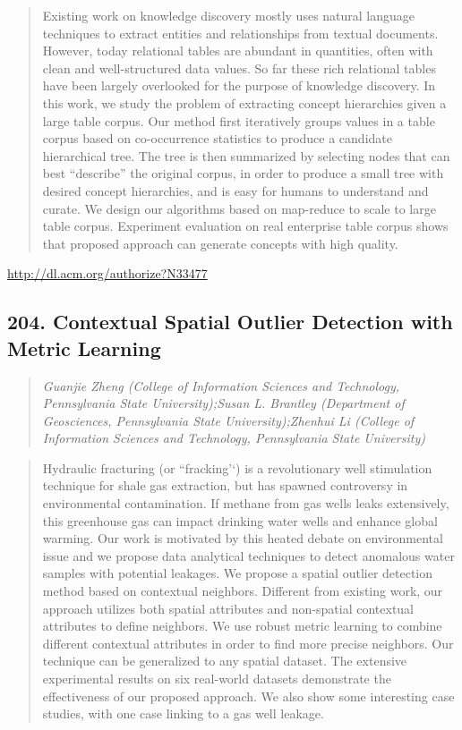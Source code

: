 \documentclass{article}
\begin{document}
\begin{quote}
Existing work on knowledge discovery mostly uses natural language techniques to extract entities and relationships from textual documents. However, today relational tables are abundant in quantities, often with clean and well-structured data values. So far these rich relational tables have been largely overlooked for the purpose of knowledge discovery. In this work, we study the problem of extracting concept hierarchies given a large table corpus. Our method first iteratively groups values in a table corpus based on co-occurrence statistics to produce a candidate hierarchical tree. The tree is then summarized by selecting nodes that can best “describe” the original corpus, in order to produce a small tree with desired concept hierarchies, and is easy for humans to understand and curate. We design our algorithms based on map-reduce to scale to large table corpus. Experiment evaluation on real enterprise table corpus shows that proposed approach can generate concepts with high quality.
\end{quote}

\href{http://dl.acm.org/authorize?N33477}{http://dl.acm.org/authorize?N33477}

\subsection{204. Contextual Spatial Outlier Detection with Metric Learning}

\begin{quote}
\footnotesize{\textit{Guanjie Zheng (College of Information Sciences and Technology, Pennsylvania State University);Susan L. Brantley (Department of Geosciences, Pennsylvania State University);Zhenhui Li (College of Information Sciences and Technology, Pennsylvania State University)}}

\end{quote}

\begin{quote}
Hydraulic fracturing (or ``fracking’‘) is a revolutionary well stimulation technique for shale gas extraction, but has spawned controversy in environmental contamination. If methane from gas wells leaks extensively, this greenhouse gas can impact drinking water wells and enhance global warming. Our work is motivated by this heated debate on environmental issue and we propose data analytical techniques to detect anomalous water samples with potential leakages. We propose a spatial outlier detection method based on contextual neighbors. Different from existing work, our approach utilizes both spatial attributes and non-spatial contextual attributes to define neighbors. We use robust metric learning to combine different contextual attributes in order to find more precise neighbors. Our technique can be generalized to any spatial dataset. The extensive experimental results on six real-world datasets demonstrate the effectiveness of our proposed approach. We also show some interesting case studies, with one case linking to a gas well leakage.
\end{quote}
\end{document}
